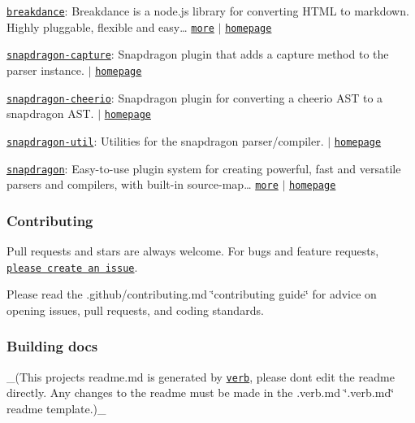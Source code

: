 \begin{DoxyItemize}
\item \href{https://www.npmjs.com/package/breakdance}{\tt breakdance}\+: Breakdance is a node.\+js library for converting H\+T\+ML to markdown. Highly pluggable, flexible and easy… \href{http://breakdance.io}{\tt more} $\vert$ \href{http://breakdance.io}{\tt homepage}
\item \href{https://www.npmjs.com/package/snapdragon-capture}{\tt snapdragon-\/capture}\+: Snapdragon plugin that adds a capture method to the parser instance. $\vert$ \href{https://github.com/jonschlinkert/snapdragon-capture}{\tt homepage}
\item \href{https://www.npmjs.com/package/snapdragon-cheerio}{\tt snapdragon-\/cheerio}\+: Snapdragon plugin for converting a cheerio A\+ST to a snapdragon A\+ST. $\vert$ \href{https://github.com/jonschlinkert/snapdragon-cheerio}{\tt homepage}
\item \href{https://www.npmjs.com/package/snapdragon-util}{\tt snapdragon-\/util}\+: Utilities for the snapdragon parser/compiler. $\vert$ \href{https://github.com/jonschlinkert/snapdragon-util}{\tt homepage}
\item \href{https://www.npmjs.com/package/snapdragon}{\tt snapdragon}\+: Easy-\/to-\/use plugin system for creating powerful, fast and versatile parsers and compilers, with built-\/in source-\/map… \href{https://github.com/jonschlinkert/snapdragon}{\tt more} $\vert$ \href{https://github.com/jonschlinkert/snapdragon}{\tt homepage}
\end{DoxyItemize}

\subsubsection*{Contributing}

Pull requests and stars are always welcome. For bugs and feature requests, \href{../../issues/new}{\tt please create an issue}.

Please read the .github/contributing.\+md \char`\"{}contributing guide\char`\"{} for advice on opening issues, pull requests, and coding standards.

\subsubsection*{Building docs}

\+\_\+(This project\textquotesingle{}s readme.\+md is generated by \href{https://github.com/verbose/verb-generate-readme}{\tt verb}, please don\textquotesingle{}t edit the readme directly. Any changes to the readme must be made in the .verb.\+md \char`\"{}.\+verb.\+md\char`\"{} readme template.)\+\_\+

